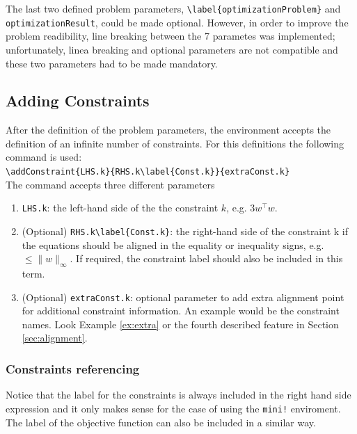 \documentclass[a4paper]{article}
\begin{document}
The last two defined problem parameters,  \verb|\label{optimizationProblem}| and \verb|optimizationResult|, could be made optional. However, in order to improve the problem readibility, line breaking between the 7 parametes was implemented; unfortunately, linea breaking and optional parameters are not compatible and these two parameters had to be made mandatory.

\subsection{Adding Constraints}

After the definition of the problem parameters, the environment accepts the definition of an infinite number of constraints. For this definitions the following command is used:
~\\

\verb|\addConstraint{LHS.k}{RHS.k\label{Const.k}}{extraConst.k}| 
~\\

The command accepts three different parameters
\begin{enumerate}
	\item \verb|LHS.k|: the left-hand side of the the constraint $k$, e.g. $3w^\top w$.
	\item (Optional) \verb|RHS.k\label{Const.k}|: the right-hand side of the constraint k if the equations should be aligned in the equality or inequality signs, e.g. $\leq \|w\|_\infty$. If required, the constraint label should also be included in this term. 
	\item (Optional) \verb|extraConst.k|: optional parameter to add extra alignment point for additional constraint information. An example would be the constraint names. Look Example \ref{ex:extra} or the fourth described feature in Section \ref{sec:alignment}.
\end{enumerate}

\subsubsection{Constraints referencing}
Notice that the label for the constraints is always included in the right hand side expression and it only makes sense for the case of using the \verb|mini!| enviroment. The label of the objective function can also be included in a similar way.
\end{document}
